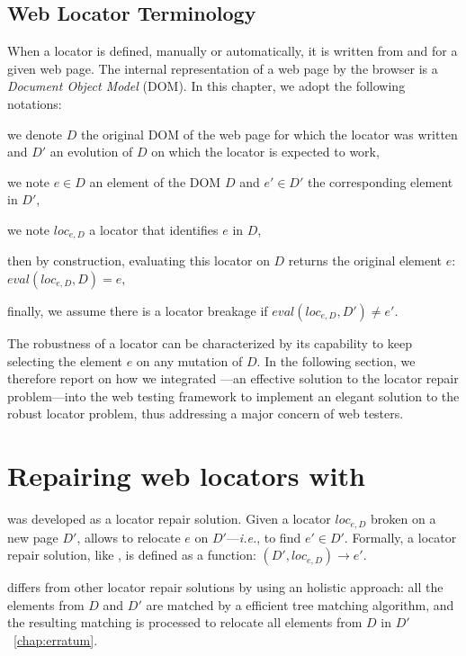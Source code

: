 \subsection{Web Locator Terminology}
When a locator is defined, manually or automatically, it is written from and for a given web page.
The internal representation of a web page by the browser is a \emph{Document Object Model} (DOM).
In this chapter, we adopt the following notations:
\begin{compactitem}
    \item we denote $D$ the original DOM of the web page for which the locator was written and $D'$ an evolution of $D$ on which the locator is expected to work,
    \item we note $e \in D$ an element of the DOM $D$ and $e'\in D'$ the corresponding element in $D'$,
    \item we note $loc_{e, D}$ a locator that identifies $e$ in $D$,
    \item then by construction, evaluating this locator on $D$ returns the original element $e$: $eval(loc_{e, D}, D) = e$,
    \item finally, we assume there is a locator breakage if $eval(loc_{e, D}, D') \neq e'$.
\end{compactitem}

The robustness of a locator can be characterized by its capability to keep selecting the element $e$ on any mutation of $D$.
In the following section, we therefore report on how we integrated \erratum---an effective solution to the locator repair problem---into the \cerberus web testing framework to implement an elegant solution to the robust locator problem, thus addressing a major concern of web testers.

\section{Repairing web locators with \erratum}\label{cerberus:sec:erratum}
\erratum was developed as a locator repair solution. 
Given a locator $loc_{e, D}$ broken on a new page $D'$, \erratum allows to relocate $e$ on $D'$---\emph{i.e.}, to find $e' \in D'$.
Formally, a locator repair solution, like \erratum, is defined as a function: $(D', loc_{e, D}) \to e'$.

\erratum differs from other locator repair solutions by using an holistic approach: all the elements from $D$ and $D'$ are matched by a efficient tree matching algorithm, and the resulting matching is processed to relocate all elements from $D$ in $D'$~\ref{chap:erratum}.

